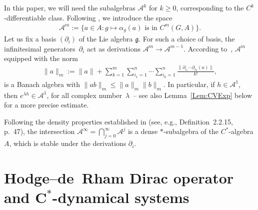 \documentclass[pdftex]{sigma}
\newcommand{\Aa}{\mathcal{A}}
\newcommand{\LieG}{\mathfrak{g}}
\numberwithin{equation}{section}
\begin{document}
In this paper, we will need the subalgebras $\Aa^k$ for $k \geqslant 0$, corresponding to the $C^k$-dif\/fe\-ren\-tiab\-le class. Following \cite[Section~2.2]{DerivBratteli}, we introduce the space
\begin{gather*}
\Aa^m := \big\{ a \in A\colon g \mapsto \alpha_g(a) \text{ is in }C^m(G, A) \big\}.
\end{gather*}
Let us f\/ix a basis $(\partial _i)$ of the Lie algebra $\LieG$. For such a choice of basis, the inf\/initesimal genera\-tors~$\partial _i$ act as derivations $\Aa^m \to \Aa^{m-1}$. According to~\cite[Example~2.2.4, p.~41]{DerivBratteli}, $\Aa^m$ equipped with the norm
\begin{gather*}
\| a \|_m := \|a \| + \sum_{k=1}^m \sum_{i_1=1}^n \cdots \sum_{i_k=1}^n \frac{\| \partial_{i_1} \cdots \partial_{i_k}(a) \|}{k !},
\end{gather*}
is a Banach algebra with $\|a b \|_m \leqslant \| a \|_m \| b\|_m$. In particular, if $h \in \Aa^1$, then $e^{\lambda h} \in \Aa^1$, for all complex number~$\lambda$~-- see also Lemma~\ref{Lem:CVExp} below for a more precise estimate.

Following the density properties established in \cite{DerivBratteli} (see, e.g., Def\/inition~2.2.15, p.~47), the intersection $\Aa^\infty = \bigcap_{j=0}^\infty \Aa^j$ is a dense $*$-subalgebra of the $C^*$-algebra $A$, which is stable under the derivations $\partial _i$.

\section[Hodge--de~Rham Dirac operator and $C^*$-dynamical systems]{Hodge--de~Rham Dirac operator and $\boldsymbol{C^*}$-dynamical systems}
\label{Sec:HodgeOperator}
\end{document}

